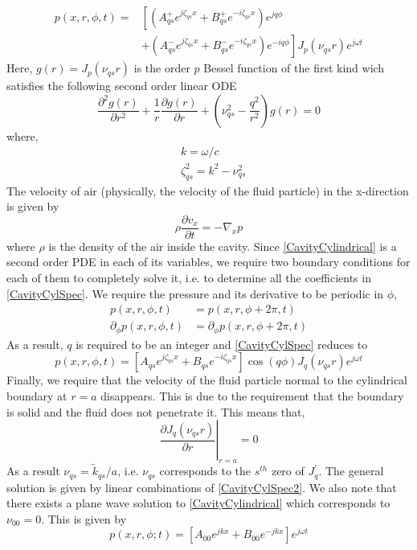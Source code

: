 \documentclass[a4paper,10pt]{article}
\begin{document}
\begin{align}\label{CavityCylSpec}
p(x,r,\phi,t)=&\left[\left(A^+_{qs}e^{j\zeta_{qs}x} + B^+_{qs}e^{-i\zeta_{qs}x}\right)e^{jq\phi}\right.\nonumber\\
                    &+\left.\left(A^-_{qs}e^{j\zeta_{qs}x}+B^-_{qs}e^{-i\zeta_{qs}x}\right)e^{-iq\phi}\right] J_p(\nu_{qs}r)e^{j\omega t}
\end{align}
Here, $g(r)=J_p(\nu_{qs}r)$ is the order $p$ Bessel function of the first kind wich satisfies the following
second order linear ODE
\begin{equation}\label{besseleqn}
 \frac{\partial^2 g(r)}{\partial r^2}+\frac{1}{r}\frac{\partial g(r)}{\partial r}+\left(\nu^2_{qs}-\frac{q^2}{r^2}\right)g(r)=0
\end{equation}
where, 
\begin{align}
&k=\omega/c\\
&\zeta^2_{qs}=k^2-\nu^2_{qs}\label{wavenumbers}
\end{align}
The velocity of air (physically, the velocity of the fluid particle) in the x-direction is given by
\begin{equation}\label{airvelocity}
 \rho\frac{\partial v_x}{\partial t}=-\nabla_x p
\end{equation}
 where $\rho$ is the density of the air inside the cavity. Since \eqref{CavityCylindrical} is 
a second order PDE in each of its variables, we require two boundary conditions for each of them 
to completely solve it, i.e. to determine all the coefficients in \eqref{CavityCylSpec}. We require
the pressure and its derivative to be periodic in $\phi$, 
\begin{align}
 p(x,r,\phi,t)&=p(x,r,\phi+2\pi,t)\label{phboundary1}\\
 \partial_\phi p(x,r,\phi,t)&=\partial_\phi p(x,r,\phi+2\pi,t)\label{phboundary2}
\end{align}
As a result, $q$ is required to be an integer and \eqref{CavityCylSpec} reduces to
\begin{equation}\label{CavityCylSpec2}
 p(x,r,\phi,t)=\left[A_{qs}e^{j\zeta_{qs}x}+B_{qs}e^{-i\zeta_{qs}x}\right]\cos(q\phi) J_q(\nu_{qs}r)e^{j\omega t}
\end{equation}
Finally, we require that the velocity of the fluid particle normal to the cylindrical boundary at
$r=a$ disappears. This is due to the requirement that the boundary is solid and the fluid does not
penetrate it. This means that,
\begin{equation}\label{normalboundary}
 \left.\frac{\partial J_q(\nu_{qs}r)}{\partial r}\right|_{r=a}=0
\end{equation}
As a result $\nu_{qs}=\widetilde{k}_{qs}/a$, i.e. $\nu_{qs}$ corresponds to the $s^{th}$ zero of $J^\prime_q$. The general solution is given by linear combinations of \eqref{CavityCylSpec2}. 
We also note that there exists a plane wave solution to \eqref{CavityCylindrical} which corresponds to
$\nu_{00}=0$. This is given by
\begin{equation}\label{CylinderPlaneWave}
 p(x,r,\phi;t)=\left[A_{00}e^{jkx}+B_{00}e^{-jkx}\right]e^{j\omega t}
\end{equation}
\end{document}
